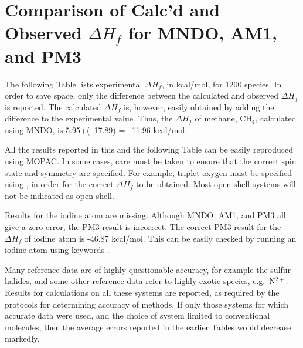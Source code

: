


\clearpage

\clearpage

\clearpage

\clearpage

\clearpage

\clearpage

\clearpage

\clearpage

\clearpage

\clearpage

\clearpage


\clearpage

\section{Comparison of Calc'd and Observed $\Delta H_f$ for MNDO, AM1, and PM3}
The following Table lists experimental $\Delta H_f$, in kcal/mol, for  1200
species.  In order to save space, only the difference between the calculated
and observed $\Delta H_f$ is reported.  The calculated $\Delta H_f$ is,
however, easily obtained by adding the difference to the experimental value. 
Thus, the $\Delta H_f$ of  methane, CH$_4$,  calculated using MNDO, is
5.95+(--17.89) = --11.96 kcal/mol.

All the results reported in this and the following Table can be easily
reproduced using MOPAC.  In some cases, care must be taken to ensure that the
correct spin state and symmetry are specified.  For example, triplet oxygen
must be specified using , in order for the correct
$\Delta H_f$ to be obtained.   Most open-shell systems will not be indicated as
open-shell.

Results for the iodine atom are missing.  Although MNDO, AM1, and PM3 all give
a zero error, the PM3 result is incorrect.  The correct PM3 result for the
$\Delta H_f$ of iodine atom is -46.87 kcal/mol.  This can be easily checked by
running an iodine atom using keywords .

Many reference data are of highly questionable accuracy, for example the sulfur
halides, and some other reference data refer to highly exotic species, e.g.\
N$^{2+}$. Results for calculations on all these systems are reported, as
required by the protocols for determining accuracy of methods.  If only those
systems for which accurate data were used, and the choice of system limited to
conventional molecules, then the average errors reported in the earlier Tables
would decrease markedly.

